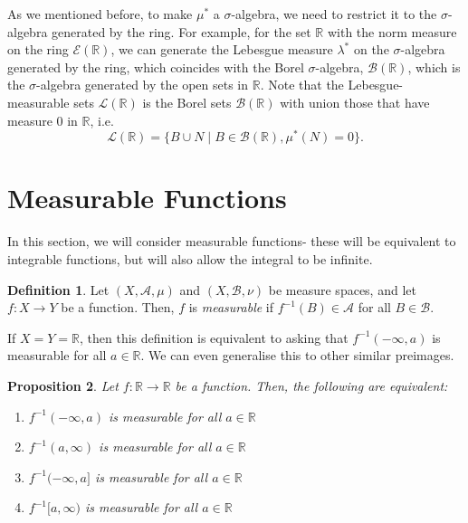 \documentclass[a4paper, openany]{memoir}
\theoremstyle{definition}
\newtheorem{definition}{Definition}[section]
\theoremstyle{plain}
\newtheorem{proposition}[definition]{Proposition}
\begin{document}
    As we mentioned before, to make $\mu^*$ a $\sigma$-algebra, we need to restrict it to the $\sigma$-algebra generated by the ring. For example, for the set $\mathbb{R}$ with the norm measure on the ring $\mathcal{E}(\mathbb{R})$, we can generate the Lebesgue measure $\lambda^*$ on the $\sigma$-algebra generated by the ring, which coincides with the Borel $\sigma$-algebra, $\mathcal{B}(\mathbb{R})$, which is the $\sigma$-algebra generated by the open sets in $\mathbb{R}$. Note that the Lebesgue-measurable sets $\mathcal{L}(\mathbb{R})$ is the Borel sets $\mathcal{B}(\mathbb{R})$ with union those that have measure $0$ in $\mathbb{R}$, i.e.
    \[\mathcal{L}(\mathbb{R}) = \{B \cup N \mid B \in \mathcal{B}(\mathbb{R}), \mu^*(N) = 0\}.\]
    \newpage

    \section{Measurable Functions}
    In this section, we will consider measurable functions- these will be equivalent to integrable functions, but will also allow the integral to be infinite.
    \begin{definition}
        Let $(X, \mathcal{A}, \mu)$ and $(X, \mathcal{B}, \nu)$ be measure spaces, and let $f \colon X \to Y$ be a function. Then, $f$ is \emph{measurable} if $f^{-1}(B) \in \mathcal{A}$ for all $B \in \mathcal{B}$.
    \end{definition}
    \noindent If $X = Y = \mathbb{R}$, then this definition is equivalent to asking that $f^{-1}(-\infty, a)$ is measurable for all $a \in \mathbb{R}$. We can even generalise this to other similar preimages.
    \begin{proposition}
        Let $f \colon \mathbb{R} \to \mathbb{R}$ be a function. Then, the following are equivalent:
        \begin{enumerate}
            \item $f^{-1}(-\infty, a)$ is measurable for all $a \in \mathbb{R}$
            \item $f^{-1}(a, \infty)$ is measurable for all $a \in \mathbb{R}$
            \item $f^{-1}(-\infty, a]$ is measurable for all $a \in \mathbb{R}$
            \item $f^{-1}[a, \infty)$ is measurable for all $a \in \mathbb{R}$
        \end{enumerate}
    \end{proposition}
\end{document}
